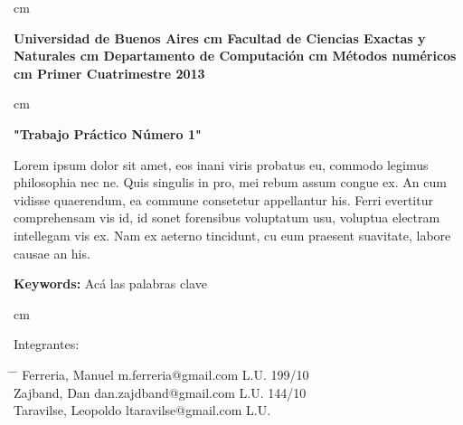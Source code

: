  cm
\begin{flushright}
\huge\bf Universidad de Buenos Aires
 cm
\Large\bf Facultad de Ciencias Exactas y Naturales
 cm
\Large\bf Departamento de Computaci\'on
 cm
\Large\bf  M\'etodos num\'ericos  
 cm
\Large\bf Primer Cuatrimestre 2013
\end{flushright}

 cm
\begin{center}
\LARGE\bf "Trabajo Pr\'actico N\'umero 1"

\vskip 1.0cm
\normalsize Lorem ipsum dolor sit amet, eos inani viris probatus eu, commodo legimus philosophia nec ne. Quis singulis in pro, mei rebum assum congue ex. An cum vidisse quaerendum, ea commune consetetur appellantur his. Ferri evertitur comprehensam vis id, id sonet forensibus voluptatum usu, voluptua electram intellegam vis ex. Nam ex aeterno tincidunt, cu eum praesent suavitate, labore causae an his.

\vskip 1.0cm
\large {\bf Keywords:} Ac\'a las palabras clave

\end{center}



 cm
\begin{flushleft}
\large Integrantes:
\begin{tabbing}
\hspace{5cm} \= \hspace{5.5cm} \= \hspace{3cm} \kill
Ferreria, Manuel \> m.ferreria@gmail.com \> L.U. 199/10  \\
Zajband, Dan \> dan.zajdband@gmail.com \> L.U. 144/10 \\
Taravilse, Leopoldo \> ltaravilse@gmail.com \> L.U.\\
\end{tabbing}
\end{flushleft}
